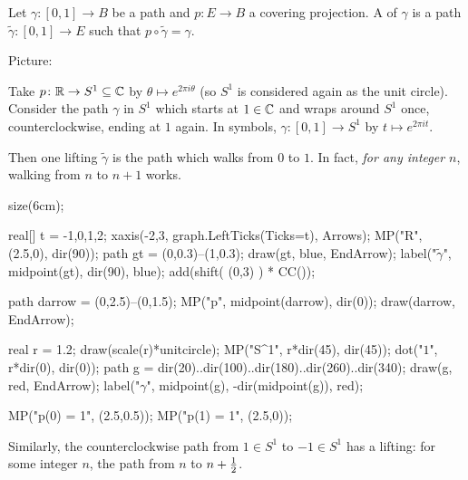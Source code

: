 \begin{definition}
	Let $\gamma \colon [0,1] \to B$ be a path and $p \colon E \to B$ a covering projection.
	A  of $\gamma$ is a path $\tilde\gamma \colon [0,1] \to E$
	such that $p \circ \tilde\gamma = \gamma$.
\end{definition}
Picture:
\begin{center}
\end{center}


\begin{example}
	Take $p \colon \mathbb R \to S^1 \subseteq \mathbb C$ by $\theta \mapsto e^{2 \pi i \theta}$
	(so $S^1$ is considered again as the unit circle).
	Consider the path $\gamma$ in $S^1$ which starts at $1 \in \mathbb C$
	and wraps around $S^1$ once, counterclockwise, ending at $1$ again.
	In symbols, $\gamma \colon [0,1] \to S^1$ by $t \mapsto e^{2\pi i t}$.

	Then one lifting $\tilde\gamma$ is the path which walks from $0$ to $1$.
	In fact, \emph{for any integer $n$}, walking from $n$ to $n+1$ works.

	\begin{center}
		\begin{asy}
			size(6cm);

			real[] t = {-1,0,1,2};
			xaxis(-2,3, graph.LeftTicks(Ticks=t), Arrows);
			MP("\mathbb R", (2.5,0), dir(90));
			path gt = (0,0.3)--(1,0.3);
			draw(gt, blue, EndArrow);
			label("$\tilde\gamma$", midpoint(gt), dir(90), blue);
			add(shift( (0,3) ) * CC());

			path darrow = (0,2.5)--(0,1.5);
			MP("p", midpoint(darrow), dir(0));
			draw(darrow, EndArrow);

			real r = 1.2;
			draw(scale(r)*unitcircle);
			MP("S^1", r*dir(45), dir(45));
			dot("$1$", r*dir(0), dir(0));
			path g = dir(20)..dir(100)..dir(180)..dir(260)..dir(340);
			draw(g, red, EndArrow);
			label("$\gamma$", midpoint(g), -dir(midpoint(g)), red);

			MP("p(0) = 1", (2.5,0.5));
			MP("p(1) = 1", (2.5,0));
		\end{asy}
	\end{center}

	Similarly, the counterclockwise path from $1 \in S^1$ to $-1 \in S^1$
	has a lifting: for some integer $n$, the path from $n$ to $n+\frac{1}{2}$.
	\label{ex:lifting_circle}
\end{example}

